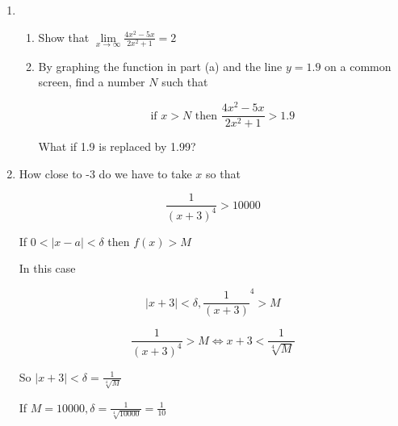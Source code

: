 \documentclass{article}
\begin{document}
\begin{enumerate}

		\item

		\begin{enumerate}
			\item Show that $\lim \limits _{x \to \infty} \frac{4x^2 - 5x}{2x^2 + 1} = 2$

			\item By graphing the function in part (a) and the line $y = 1.9$ on a common
				screen, find a number $N$ such that

				$$\text{if	} x > N \text{	then	} \frac{4x^2 - 5x}{2x^2 + 1} > 1.9$$

				What if 1.9 is replaced by 1.99?
		\end{enumerate}


		\item How close to -3 do we have to take $x$ so that

			$$\frac{1}{(x + 3)^4} > 10000$$

			If $0 < |x - a| < \delta$ then $f(x) > M$

			In this case

			$$|x+3| < \delta, \frac{1}{(x+3)}^4 > M$$

			$$\frac{1}{(x+3)^{4}} > M \Leftrightarrow x+3 < \frac{1}{\sqrt[4]{M}}$$

			So $|x+3| < \delta = \frac{1}{\sqrt[4]{M}}$

			If $M = 10000, \delta = \frac{1}{\sqrt[4]{10000}} = \frac{1}{10}$

	\end{enumerate}
\end{document}
